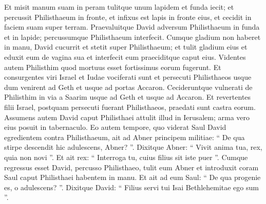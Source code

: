 \begin{biblechapter}
\begin{biblechapter}
\begin{biblechapter}
\begin{biblechapter}
\begin{biblechapter}
\begin{biblechapter}
\begin{biblechapter}
\begin{biblechapter}
\begin{biblechapter}
\begin{biblechapter}
\begin{biblechapter}
\begin{biblechapter}
\begin{biblechapter}
\begin{biblechapter}
\begin{biblechapter}
\begin{biblechapter}
\begin{biblechapter}
\verse Et misit manum suam in peram tulitque unum lapidem et funda iecit; et percussit Philisthaeum in fronte, et infixus est lapis in fronte eius, et cecidit in faciem suam super terram. 
\verse Praevaluitque David adversum Philisthaeum in funda et in lapide; percussumque Philisthaeum interfecit. Cumque gladium non haberet in manu, David 
\verse cucurrit et stetit super Philisthaeum; et tulit gladium eius et eduxit eum de vagina sua et interfecit eum praeciditque caput eius.
 Videntes autem Philisthim quod mortuus esset fortissimus eorum fugerunt. 
\verse Et consurgentes viri Israel et Iudae vociferati sunt et persecuti Philisthaeos usque dum venirent ad Geth et usque ad portas Accaron. Cecideruntque vulnerati de Philisthim in via a Saarim usque ad Geth et usque ad Accaron. 
\verse Et revertentes filii Israel, postquam persecuti fuerant Philisthaeos, praedati sunt castra eorum. 
\verse Assumens autem David caput Philisthaei attulit illud in Ierusalem; arma vero eius posuit in tabernaculo.
 \verse Eo autem tempore, quo viderat Saul David egredientem contra Philisthaeum, ait ad Abner principem militiae: “ De qua stirpe descendit hic adulescens, Abner? ”. Dixitque Abner: “ Vivit anima tua, rex, quia non novi ”. 
\verse Et ait rex: “ Interroga tu, cuius filius sit iste puer ”. 
\verse Cumque regressus esset David, percusso Philisthaeo, tulit eum Abner et introduxit coram Saul caput Philisthaei habentem in manu. 
\verse Et ait ad eum Saul: “ De qua progenie es, o adulescens? ”. Dixitque David: “ Filius servi tui Isai Bethlehemitae ego sum ”.
 

\end{biblechapter}
\end{biblechapter}
\end{biblechapter}
\end{biblechapter}
\end{biblechapter}
\end{biblechapter}
\end{biblechapter}
\end{biblechapter}
\end{biblechapter}
\end{biblechapter}
\end{biblechapter}
\end{biblechapter}
\end{biblechapter}
\end{biblechapter}
\end{biblechapter}
\end{biblechapter}
\end{biblechapter}
